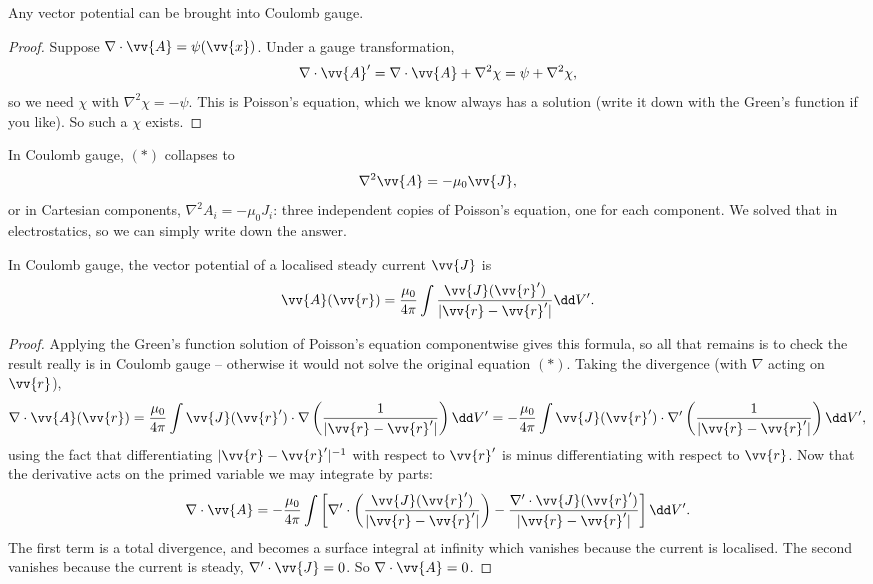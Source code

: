 \begin{proposition}
	Any vector potential can be brought into Coulomb gauge.
\end{proposition}
\begin{proof}
	Suppose $\nabla\cdot\vv{A} = \psi(\vv{x})$. Under a gauge transformation,
	$$
	\nabla\cdot \vv{A}' = \nabla\cdot\vv{A} + \nabla^2 \chi = \psi + \nabla^2 \chi,
	$$
	so we need $\chi$ with $\nabla^2 \chi = -\psi$. This is Poisson's equation, which we know always has a solution (write it down with the Green's function if you like). So such a $\chi$ exists.
\end{proof}

In Coulomb gauge, $(*)$ collapses to
$$
\nabla^2 \vv{A} = -\mu_0 \vv{J},
$$
or in Cartesian components, $\nabla^2 A_i = -\mu_0 J_i$: three independent copies of Poisson's equation, one for each component. We solved that in electrostatics, so we can simply write down the answer.

\begin{proposition}
	\label{prop:A-general}
	In Coulomb gauge, the vector potential of a localised steady current $\vv{J}$ is
	$$
	\vv{A}(\vv{r}) = \frac{\mu_0}{4\pi}\int \frac{\vv{J}(\vv{r}')}{|\vv{r}-\vv{r}'|}\dd V'.
	$$
\end{proposition}
\begin{proof}
	Applying the Green's function solution of Poisson's equation componentwise gives this formula, so all that remains is to check the result really is in Coulomb gauge -- otherwise it would not solve the original equation $(*)$. Taking the divergence (with $\nabla$ acting on $\vv{r}$),
	$$
	\nabla\cdot \vv{A}(\vv{r}) = \frac{\mu_0}{4\pi}\int \vv{J}(\vv{r}')\cdot \nabla\left(\frac{1}{|\vv{r}-\vv{r}'|}\right)\dd V' = -\frac{\mu_0}{4\pi}\int\vv{J}(\vv{r}')\cdot\nabla'\left(\frac{1}{|\vv{r}-\vv{r}'|}\right)\dd V',
	$$
	using the fact that differentiating $|\vv{r}-\vv{r}'|^{-1}$ with respect to $\vv{r}'$ is minus differentiating with respect to $\vv{r}$. Now that the derivative acts on the primed variable we may integrate by parts:
	$$
	\nabla \cdot \vv{A} = -\frac{\mu_0}{4\pi}\int\left[\nabla'\cdot\left(\frac{\vv{J}(\vv{r}')}{|\vv{r}-\vv{r}'|}\right) - \frac{\nabla'\cdot \vv{J}(\vv{r}')}{|\vv{r}-\vv{r}'|}\right]\dd V'.
	$$
	The first term is a total divergence, and becomes a surface integral at infinity which vanishes because the current is localised. The second vanishes because the current is steady, $\nabla'\cdot \vv{J} = 0$. So $\nabla\cdot \vv{A} = 0$.
\end{proof}

